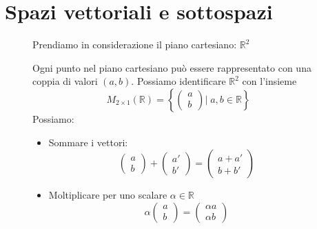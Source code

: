 \documentclass[a4paper]{article}
\theoremstyle{break}
\theoremstyle{break}
\theoremstyle{break}
\theoremstyle{break}
\begin{document}
  \section{Spazi vettoriali e sottospazi}
  \begin{figure}[H]
    \begin{example}
      Prendiamo in considerazione il piano cartesiano: \( \mathbb{R}^2 \) 
      \begin{center}
      \end{center}

      \noindent Ogni punto nel piano cartesiano può essere rappresentato con una coppia
      di valori \( (a,b) \). Possiamo identificare \( \mathbb{R}^2 \) con l'insieme
      \[ M_{2 \times 1}(\mathbb{R}) = \left\{ \begin{pmatrix} a\\b \end{pmatrix} \Big|\; a,b \in \mathbb{R} \right\} \]
      Possiamo:
      \begin{itemize}
        \item Sommare i vettori:
          \[
          \begin{pmatrix} 
            a\\b
          \end{pmatrix} 
          +
          \begin{pmatrix} 
            a'\\b'
          \end{pmatrix} 
          =
          \begin{pmatrix} 
            a+a'\\b+b'
          \end{pmatrix}
          \] 
        \item Moltiplicare per uno scalare \( \alpha \in \mathbb{R} \) 
          \[
          \alpha \begin{pmatrix} 
            a\\b
          \end{pmatrix}
          =
          \begin{pmatrix} 
            \alpha a\\ \alpha b
          \end{pmatrix}
          \] 
      \end{itemize}
    \end{example}
  \end{figure}
\end{document}
